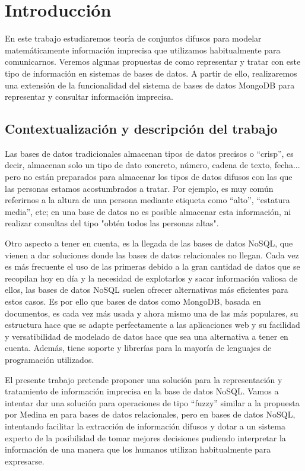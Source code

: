 \section{Introducción}

En este trabajo estudiaremos teoría de conjuntos difusos para modelar matemáticamente información imprecisa que utilizamos habitualmente para comunicarnos. Veremos algunas propuestas de como representar y tratar con este tipo de información en sistemas de bases de datos. A partir de ello, realizaremos una extensión de la funcionalidad del sistema de bases de datos MongoDB para representar y consultar información imprecisa.

\subsection{Contextualización y descripción del trabajo}

Las bases de datos tradicionales almacenan tipos de datos precisos o ``crisp'', es decir, almacenan solo un tipo de dato concreto, número, cadena de texto, fecha... pero no están preparados para almacenar los tipos de datos difusos con las que las personas estamos acostumbrados a tratar. Por ejemplo, es muy común referirnos a la altura de una persona mediante etiqueta como ``alto'', ``estatura media'', etc; en una base de datos no es posible almacenar esta información, ni realizar consultas del tipo "obtén todos las personas altas". 

Otro aspecto a tener en cuenta, es la llegada de las bases de datos NoSQL, que vienen a dar soluciones donde las bases de datos relacionales no llegan. Cada vez es más frecuente el uso de las primeras debido a la gran cantidad de datos que se recopilan hoy en día y la necesidad de explotarlos y sacar información valiosa de ellos, las bases de datos NoSQL suelen ofrecer alternativas más eficientes para estos casos. Es por ello que bases de datos como MongoDB, basada en documentos, es cada vez más usada y ahora mismo una de las más populares, su estructura hace que se adapte perfectamente a las aplicaciones web y su facilidad y versatibilidad de modelado de datos hace que sea una alternativa a tener en cuenta. Además, tiene soporte y librerías para la mayoría de lenguajes de programación utilizados.

El presente trabajo pretende proponer una solución para la representación y tratamiento de información imprecisa en la base de datos NoSQL. Vamos a intentar dar una solución para operaciones de tipo ``fuzzy'' similar a la propuesta por Medina en \cite{tesismedina} para bases de datos relacionales, pero en bases de datos NoSQL, intentando facilitar la extracción de información difusos y dotar a un sistema experto de la posibilidad de tomar mejores decisiones pudiendo interpretar la información de una manera que los humanos utilizan habitualmente para expresarse.

